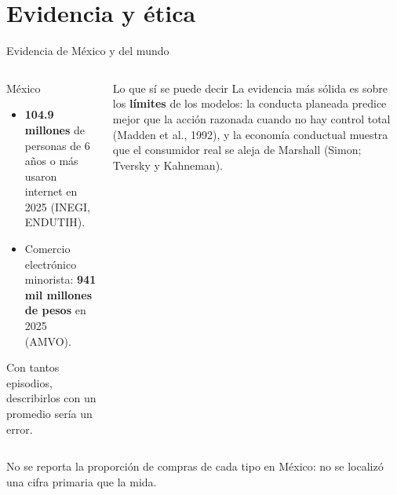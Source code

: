 \documentclass[aspectratio=169,xcolor=dvipsnames]{beamer}
\begin{document}
\section[Evidencia y ética]{Evidencia y ética}

\begin{frame}{Evidencia de México y del mundo}
\begin{columns}[T]
  \begin{block}{México}
    \small
    \begin{itemize}
      \item \textbf{104.9 millones} de personas de 6 años o más usaron internet en 2025 (INEGI, ENDUTIH).
      \item Comercio electrónico minorista: \textbf{941 mil millones de pesos} en 2025 (AMVO).
    \end{itemize}
    \footnotesize Con tantos episodios, describirlos con un promedio sería un error.
  \end{block}
  \begin{alertblock}{Lo que sí se puede decir}
    \small La evidencia más sólida es sobre los \textbf{límites} de los modelos: la conducta planeada predice mejor que la acción razonada cuando no hay control total (Madden et al., 1992), y la economía conductual muestra que el consumidor real se aleja de Marshall (Simon; Tversky y Kahneman).
  \end{alertblock}
\end{columns}
\vspace{2pt}
{\scriptsize No se reporta la proporción de compras de cada tipo en México: no se localizó una cifra primaria que la mida.}
\end{frame}
\end{document}
